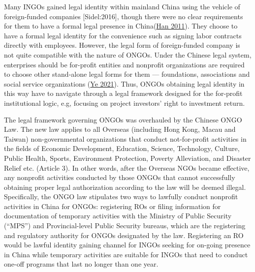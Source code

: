 \documentclass[
]{article}
\begin{document}
Many INGOs gained legal identity within mainland China using the vehicle
of foreign-funded companies {[}Sidel:2016{]}, though there were no clear
requirements for them to have a formal legal presence in
China(\protect\hyperlink{ref-Han:2011}{Han 2011}). They choose to have a
formal legal identity for the convenience such as signing labor
contracts directly with employees. However, the legal form of
foreign-funded company is not quite compatible with the nature of ONGOs.
Under the Chinese legal system, enterprises should be for-profit
entities and nonprofit organizations are required to choose other
stand-alone legal forms for them --- foundations, associations and
social service organizations (\protect\hyperlink{ref-Ye:2021}{Ye 2021}).
Thus, ONGOs obtaining legal identity in this way have to navigate
through a legal framework designed for the for-profit institutional
logic, e.g, focusing on project investors' right to investment return.

The legal framework governing ONGOs was overhauled by the Chinese ONGO
Law. The new law applies to all Overseas (including Hong Kong, Macau and
Taiwan) non-governmental organizations that conduct not-for-profit
activities in the fields of Economic Development, Education, Science,
Technology, Culture, Public Health, Sports, Environment Protection,
Poverty Alleviation, and Disaster Relief etc. (Article 3). In other
words, after the Overseas NGOs became effective, any nonprofit
activities conducted by those ONGOs that cannot successfully obtaining
proper legal authorization according to the law will be deemed illegal.
Specifically, the ONGO law stipulates two ways to lawfully conduct
nonprofit activities in China for ONGOs: registering ROs or filing
information for documentation of temporary activities with the Ministry
of Public Security (``MPS'') and Provincial-level Public Security
bureaus, which are the registering and regulatory authority for ONGOs
designated by the law. Registering an RO would be lawful identity
gaining channel for INGOs seeking for on-going presence in China while
temporary activities are suitable for INGOs that need to conduct one-off
programs that last no longer than one year.
\end{document}
